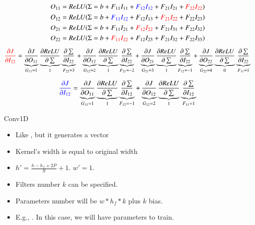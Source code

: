 \documentclass{KBook}
\begin{document}
	{\scriptsize 
		\[O_{11} = ReLU(\Sigma = b + F_{11} I_{11} + \textcolor{blue}{F_{12} I_{12}} + F_{21} I_{21} + \textcolor{red}{F_{22} I_{22}})  \]
		\[O_{12} = ReLU(\Sigma = b + \textcolor{blue}{F_{11} I_{12}} + F_{12} I_{13} + \textcolor{red}{F_{21} I_{22}} + F_{22} I_{23})  \]
		\[O_{21} = ReLU(\Sigma = b + F_{11} I_{21} + \textcolor{red}{F_{12} I_{22}} + F_{21} I_{31} + F_{22} I_{32})  \]
		\[O_{22} = ReLU(\Sigma = b + \textcolor{red}{F_{11} I_{22}} + F_{12} I_{23} + F_{21} I_{32} + F_{22} I_{33})  \]
		
		\[\textcolor{red}{\frac{\partial J}{\partial I_{22}}} 
		= \underbrace{\frac{\partial J}{\partial O_{11}}}_{G_{11} = 1} 
		\underbrace{\frac{\partial ReLU}{\partial \sum}}_{1} 
		\underbrace{\frac{\partial \sum}{\partial I_{22}}}_{F_{22} = 3}
		+ \underbrace{\frac{\partial J}{\partial O_{12}}}_{G_{12} = 2} 
		\underbrace{\frac{\partial ReLU}{\partial \sum}}_{1} 
		\underbrace{\frac{\partial \sum}{\partial I_{22}}}_{F_{21} = -2}
		+ \underbrace{\frac{\partial J}{\partial O_{21}}}_{G_{21} = 3} 
		\underbrace{\frac{\partial ReLU}{\partial \sum}}_{1} 
		\underbrace{\frac{\partial \sum}{\partial I_{22}}}_{F_{12} = -1}
		+ \underbrace{\frac{\partial J}{\partial O_{22}}}_{G_{22} = 4} 
		\underbrace{\frac{\partial ReLU}{\partial \sum}}_{0} 
		\underbrace{\frac{\partial \sum}{\partial I_{22}}}_{F_{11} = 1}\]
		
		\[\textcolor{blue}{\frac{\partial J}{\partial I_{12}}} 
		= \underbrace{\frac{\partial J}{\partial O_{11}}}_{G_{11} = 1} 
		\underbrace{\frac{\partial ReLU}{\partial \sum}}_{1} 
		\underbrace{\frac{\partial \sum}{\partial I_{12}}}_{F_{12} = -1}
		+ \underbrace{\frac{\partial J}{\partial O_{12}}}_{G_{12} = 2} 
		\underbrace{\frac{\partial ReLU}{\partial \sum}}_{1} 
		\underbrace{\frac{\partial \sum}{\partial I_{12}}}_{F_{11} = 1}\]
	}
	
Conv1D
	
	\begin{minipage}{0.62\textwidth} 
		\begin{itemize}
			\item Like , but it generates a vector
			\item Kernel's width is equal to original width
			\item $ h' = \frac{h - h_f + 2P}{S} + 1$. $ w' = 1$.
			\item Filters number $k$ can be specified.
			\item Parameters number will be $w * h_f * k$ plus $k$ bias.
			\item E.g., . In this case, we will have  parameters to train.
		\end{itemize}
	\end{minipage}
	\begin{minipage}{0.37\textwidth}
	\end{minipage}
	
\end{document}
